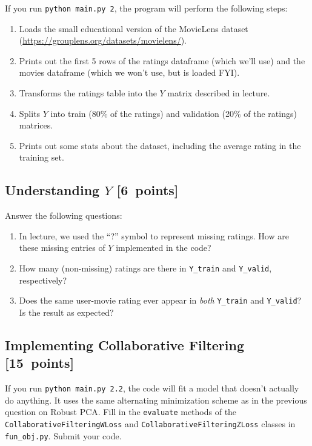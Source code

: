 \documentclass{article}
\newcommand{\blu}[1]{{\textcolor{blu}{#1}}}
\let\ask\blu
\newcommand\pts[1]{\textcolor{pointscolour}{[#1~points]}}
\begin{document}
If you run \texttt{python main.py 2}, the program will perform the following steps:

\begin{enumerate}
\item Loads the small educational version of the MovieLens dataset (\url{https://grouplens.org/datasets/movielens/}).
\item Prints out the first 5 rows of the ratings dataframe (which we'll use) and the movies dataframe (which we won't use, but is loaded FYI).
\item Transforms the ratings table into the $Y$ matrix described in lecture.
\item Splits $Y$ into train (80\% of the ratings) and validation (20\% of the ratings) matrices.
\item Prints out some stats about the dataset, including the average rating in the training set.
\end{enumerate}

\subsection{Understanding $Y$ \pts{6}}

\ask{Answer the following questions:}

\begin{enumerate}
\item In lecture, we used the ``?'' symbol to represent missing ratings. How are these missing entries of $Y$ implemented in the code?
\item How many (non-missing) ratings are there in \texttt{Y\_train} and \texttt{Y\_valid}, respectively?
\item Does the same user-movie rating ever appear in \emph{both} \texttt{Y\_train} and \texttt{Y\_valid}? Is the result as expected?
\end{enumerate}


\subsection{Implementing Collaborative Filtering \pts{15}}

If you run \texttt{python main.py 2.2}, the code will fit a model that doesn't actually do anything. It uses the same alternating minimization scheme as in the previous question on Robust PCA. \ask{Fill in the \texttt{evaluate} methods of the \texttt{CollaborativeFilteringWLoss} and \texttt{CollaborativeFilteringZLoss} classes in \texttt{fun\_obj.py}. Submit your code.}
\end{document}
